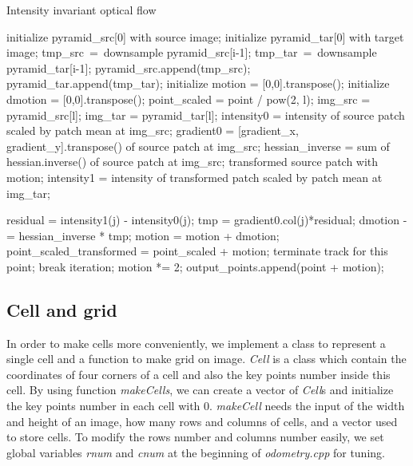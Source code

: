 \documentclass{easychair}
\begin{document}
\begin{algorithm}[h]
  \caption{Intensity invariant optical flow}  
  \label{alg:optf}
  \begin{algorithmic}[1]
  	\State initialize pyramid\_src[0] with source image;
  	\State initialize pyramid\_tar[0] with target image;
      \State tmp\_src\ =\ downsample pyramid\_src[i-1];
      \State tmp\_tar\ =\ downsample pyramid\_tar[i-1];
      \State pyramid\_src.append(tmp\_src);
      \State pyramid\_tar.append(tmp\_tar);
    \EndFor
      \State initialize motion = [0,0].transpose();
      \State initialize dmotion = [0,0].transpose();
	  	\State point\_scaled = point / pow(2, l);
      	\State img\_src = pyramid\_src[l];
      	\State img\_tar = pyramid\_tar[l];
      	\State intensity0 = intensity of source patch scaled by patch mean at img\_src;
      	\State gradient0 = [gradient\_x, gradient\_y].transpose() of source patch at img\_src;
      	\State hessian\_inverse = sum of hessian.inverse() of source patch at img\_src;
		  \State transformed source patch with motion;
      	  \State intensity1 = intensity of transformed patch scaled by patch mean at img\_tar;
      	  
      	  	\State residual = intensity1(j) - intensity0(j);
      	  	\State tmp = gradient0.col(j)*residual;
      	  	\State dmotion -= hessian\_inverse * tmp;
      	  \EndFor
      	  \State motion = motion + dmotion;
      	  \State point\_scaled\_transformed = point\_scaled + motion;
      	  	\State terminate track for this point;
      	  \EndIf
      	  	\State break iteration;
      	  \EndIf
      	\EndFor
		\State motion *= 2;      
      \EndFor 
      \State output\_points.append(point + motion);
    \EndFor 
  \end{algorithmic}  
  
\end{algorithm}  


\subsection{Cell and grid}
In order to make cells more conveniently, we implement a class to represent a single cell and a function to make grid on image. \emph{Cell} is a class which contain the coordinates of four corners of a cell and also the key points number inside this cell. By using function \emph{makeCells}, we can create a vector of \emph{Cell}s and initialize the key points number in each cell with 0. \emph{makeCell} needs the input of the width and height of an image, how many rows and columns of cells, and a vector used to store cells. To modify the rows number and columns number easily, we set global variables \emph{rnum} and \emph{cnum} at the beginning of \emph{odometry.cpp} for tuning.\\
\end{document}
